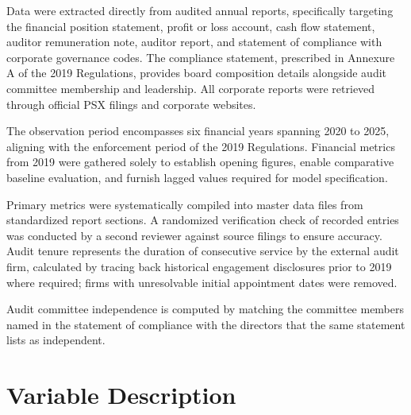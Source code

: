 Data were extracted directly from audited annual reports, specifically targeting the financial position statement, profit or loss account, cash flow statement, auditor remuneration note, auditor report, and statement of compliance with corporate governance codes. The compliance statement, prescribed in Annexure A of the 2019 Regulations, provides board composition details alongside audit committee membership and leadership. All corporate reports were retrieved through official PSX filings and corporate websites.

The observation period encompasses six financial years spanning 2020 to 2025, aligning with the enforcement period of the 2019 Regulations. Financial metrics from 2019 were gathered solely to establish opening figures, enable comparative baseline evaluation, and furnish lagged values required for model specification.

Primary metrics were systematically compiled into master data files from standardized report sections. A randomized verification check of recorded entries was conducted by a second reviewer against source filings to ensure accuracy. Audit tenure represents the duration of consecutive service by the external audit firm, calculated by tracing back historical engagement disclosures prior to 2019 where required; firms with unresolvable initial appointment dates were removed.

Audit committee independence is computed by matching the committee members named in the statement of compliance with the directors that the same statement lists as independent.

\section{Variable Description}

